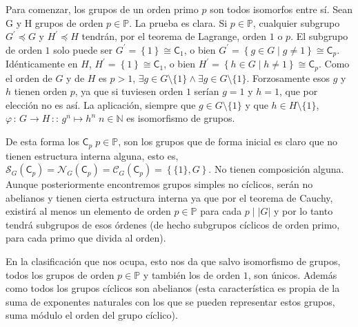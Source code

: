 \documentclass[12pt,a4paper,fleqn,spanish,final,openright]{extbook}
\theoremstyle{definition}
\theoremstyle{remark}
\begin{document}
Para comenzar, los grupos de un orden primo $p$ son todos isomorfos entre sí. 
Sean G y H grupos de orden $p   \in \mathds{P}$. La prueba es clara. 
Si $p    \in \mathds{P}$, cualquier subgrupo 
$G^\prime    \preccurlyeq    G$ y $H^\prime    \preccurlyeq    H$ 
tendrán, por el teorema de Lagrange, orden $1$ o $p$. El subgrupo de orden $1$ 
solo puede ser 
$G^\prime = \left\lbrace 1\right\rbrace    \cong    \mathsf{C}_1$, 
o bien $G^\prime = \left\lbrace g   \in G∣g   \neq    1
\right\rbrace    \cong    \mathsf{C}_p$. Idénticamente en 
$H$, $H^\prime = \left\lbrace 1\right\rbrace    \cong    \mathsf{C}_1$, 
o bien $H^\prime = \left\lbrace h   \in G∣h   \neq    1\right\rbrace    
\cong    \mathsf{C}_p$. Como el orden de $G$ y de $H$ es $p>1$, 
$   \exists    g   \in G\setminus\{1\}   \wedge       
\exists    g   \in G\setminus\{1\}$. Forzosamente esos $g$ y $h$ tienen orden $p$, 
ya que si tuviesen orden $1$ serían $g=1$ y $h=1$, que por elección no es así. 
La aplicación, siempre que $g   \in G\setminus\{1\}$ y que $h \in H\setminus\{1\}$, 
$\varphi \,:\,G \longrightarrow H\,::\, g^n \mapsto h^n \; n \in \mathds{N}$ es 
isomorfismo de grupos.

De esta forma los $\mathsf{C}_{p}\;p \in \mathds{P}$, son los grupos que de forma 
inicial es claro que no tienen estructura interna alguna, esto es, 
$\mathcal{S}_{G}{(\mathsf{C}_{p})} = \mathcal{N}_{G}{(\mathsf{C}_{p})} = 
\mathcal{C}_{G}{(\mathsf{C}_{p})} = \left\lbrace{\{1\},G}\right\rbrace$. 
No tienen composición alguna. Aunque posteriormente encontremos grupos simples 
no cíclicos, serán no abelianos y tienen cierta estructura interna ya que por el 
teorema de Cauchy, existirá al menos un elemento de orden $p \in \mathds{P}$ 
para cada $p∣\left|G\right|$ y por lo tanto tendrá subgrupos de esos órdenes 
(de hecho subgrupos cíclicos de orden primo, para cada primo que divida al orden).

En la clasificación que nos ocupa, esto nos da que salvo isomorfismo de grupos, 
todos los grupos de orden $p   \in \mathds{P}$ y también los de orden $1$, son 
únicos. Además como todos los grupos cíclicos son abelianos (esta característica 
es propia de la suma de exponentes naturales con los que se pueden representar 
estos grupos, suma módulo el orden del grupo cíclico).
\end{document}
